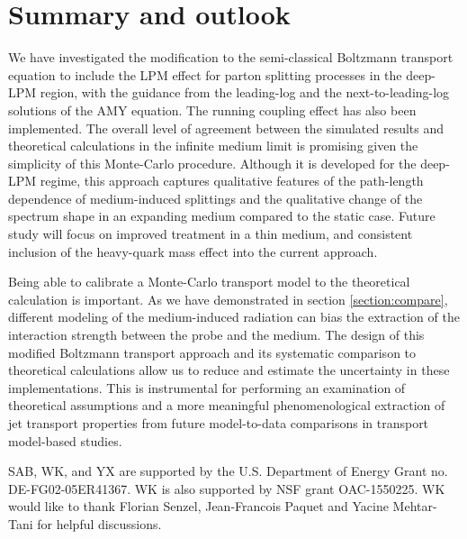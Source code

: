 \documentclass[aps, prc, reprint, amsmath, groupedaddress, nofootinbib]{revtex4-1}
\begin{document}
\section{Summary and outlook}\label{section:summary}
We have investigated the modification to the semi-classical Boltzmann transport equation to include the LPM effect for parton splitting processes in the deep-LPM region, with the guidance from the leading-log and the next-to-leading-log solutions of the AMY equation.
The running coupling effect has also been implemented.
The overall level of agreement between the simulated results and theoretical calculations in the infinite medium limit is promising given the simplicity of this Monte-Carlo procedure. 
Although it is developed for the deep-LPM regime, this approach captures qualitative features of the path-length dependence of medium-induced splittings and the qualitative change of the spectrum shape in an expanding medium compared to the static case.
Future study will focus on improved treatment in a thin medium, and consistent inclusion of the heavy-quark mass effect into the current approach.

Being able to calibrate a Monte-Carlo transport model to the theoretical calculation is important.
As we have demonstrated in section \ref{section:compare}, different modeling of the medium-induced radiation can bias the extraction of the interaction strength between the probe and the medium.
The design of this modified Boltzmann transport approach and its systematic comparison to theoretical calculations allow us to reduce and estimate the uncertainty in these implementations.
This is instrumental for performing an examination of theoretical assumptions and a more meaningful phenomenological extraction of jet transport properties from future model-to-data comparisons in transport model-based studies.

\begin{acknowledgments}
SAB, WK, and YX are supported by the U.S. Department of Energy Grant no. DE-FG02-05ER41367. WK is also supported by NSF grant OAC-1550225.
WK would like to thank Florian Senzel, Jean-Francois Paquet and Yacine Mehtar-Tani for helpful discussions.
\end{acknowledgments}
\end{document}
